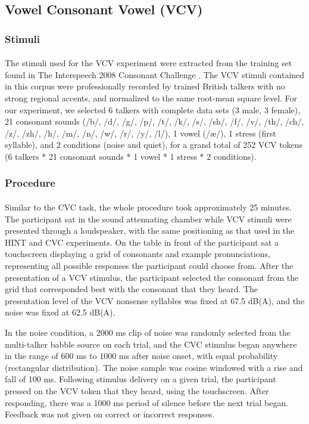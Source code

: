 \subsection{Vowel Consonant Vowel (VCV)}
\subsubsection{Stimuli}
\paragraph{}The stimuli used for the VCV experiment were extracted from the training set found in The Interspeech 2008 Consonant Challenge \cite{Cooke2008}.  The VCV stimuli contained in this corpus were professionally recorded by trained British talkers with no strong regional accents, and normalized to the same root-mean square level.  For our experiment, we selected 6 talkers with complete data sets (3 male, 3 female), 21 consonant sounds (/b/, /d/, /g/, /p/, /t/, /k/, /s/, /sh/, /f/, /v/, /th/, /ch/, /z/, /zh/, /h/, /m/, /n/, /w/, /r/, /y/, /l/), 1 vowel (/\ae /), 1 stress (first syllable), and 2 conditions (noise and quiet), for a grand total of 252 VCV tokens (6 talkers * 21 consonant sounds * 1 vowel * 1 stress * 2 conditions).
\subsubsection{Procedure}
\paragraph{}Similar to the CVC task, the whole procedure took approximately 25 minutes.  The participant sat in the sound attenuating chamber while VCV stimuli were presented through a loudspeaker, with the same positioning as that used in the HINT and CVC experiments.  On the table in front of the participant sat a touchscreen displaying a grid of consonants and example pronunciations, representing all possible responses the participant could choose from.  After the presentation of a VCV stimulus, the participant selected the consonant from the grid that corresponded best with the consonant that they heard.  The presentation level of the VCV nonsense syllables was fixed at 67.5 dB(A), and the noise was fixed at 62.5 dB(A).

In the noise condition, a 2000 ms clip of noise was randomly selected from the multi-talker babble source on each trial, and the CVC stimulus began anywhere in the range of 600 ms to 1000 ms after noise onset, with equal probability (rectangular distribution).  The noise sample was cosine windowed with a rise and fall of 100 ms. Following stimulus delivery on a given trial, the participant pressed on the VCV token that they heard, using the touchscreen.  After responding, there was a 1000 ms period of silence before the next trial began.  Feedback was not given on correct or incorrect responses.

